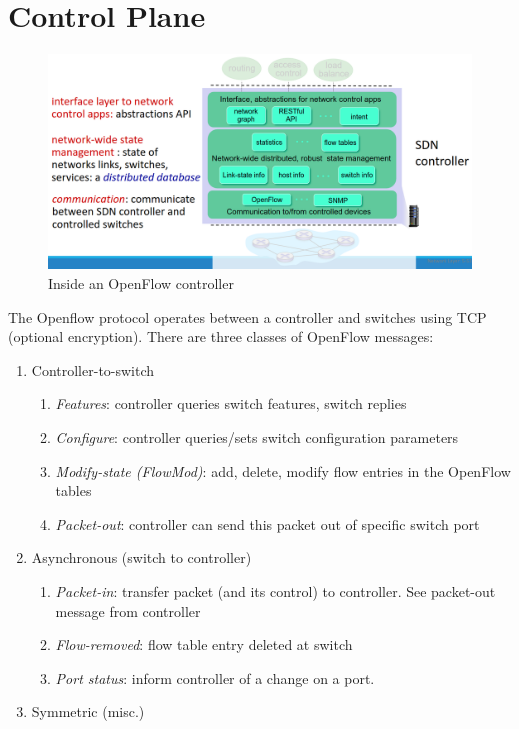 \section{Control Plane}
\begin{figure}[htbp]
   \centering
   \includegraphics{images/openflow_controllerinside.png}
   \caption{Inside an OpenFlow controller}
   \label{fig:openflow_controllerinside}
\end{figure}
The Openflow protocol operates between a controller and switches using TCP (optional encryption). There are three classes of OpenFlow messages:
\begin{enumerate}
   \item Controller-to-switch
   \begin{enumerate}
      \item \textit{Features}:
      controller queries switch features, switch replies
      \item \textit{Configure}:
      controller queries/sets switch configuration parameters
      \item \textit{Modify-state (FlowMod)}:
      add, delete, modify flow entries in the OpenFlow
      tables
      \item \textit{Packet-out}:
      controller can send this packet out of specific switch port
   \end{enumerate}
   \item Asynchronous (switch to controller) 
   \begin{enumerate}
      \item \textit{Packet-in}:
      transfer packet (and its control) to controller. See packet-out message from controller
      \item \textit{Flow-removed}:
      flow table entry deleted at switch
      \item \textit{Port status}:
      inform controller of a change on a port.
   \end{enumerate}
   \item Symmetric (misc.)
\end{enumerate} 

